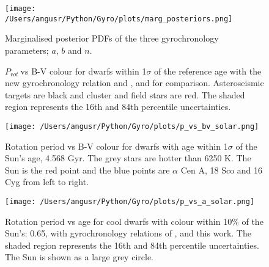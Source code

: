 \documentclass[10pt,preprint]{aastex}
\newcommand{\prot}{$P_{rot}~$}
\begin{document}
\begin{figure}[ht]
\begin{center}
\texttt{[image: /Users/angusr/Python/Gyro/plots/marg\_posteriors.png]}
\caption{Marginalised posterior PDFs of the three gyrochronology parameters; $a$, $b$ and $n$.}
\label{fig:marg_posteriors}
\end{center}
\end{figure}

\begin{figure}[ht]
\begin{center}
    \end{center}
    \caption{ \prot vs B-V colour for dwarfs within 1$\sigma$ of the reference age with the new gyrochronology relation and \citet{Barnes2007}, and \citet{Mamajek2008} for comparison. Asteroseismic targets are black and cluster and field stars are red. The shaded region represents the 16th and 84th percentile uncertainties.
     }
   \label{fig:subfigures2}
\end{figure}

\begin{figure}[ht]
\begin{center}
\texttt{[image: /Users/angusr/Python/Gyro/plots/p\_vs\_bv\_solar.png]}
\caption{Rotation period vs B-V colour for dwarfs with age within 1$\sigma$ of the Sun's age, 4.568 Gyr. The grey stars are hotter than 6250 K. The Sun is the red point and the blue points are $\alpha$ Cen A, 18 Sco and 16 Cyg from left to right.}
\label{fig:p_vs_bv_solar}
\end{center}
\end{figure}

\begin{figure}[ht]
\begin{center}
\texttt{[image: /Users/angusr/Python/Gyro/plots/p\_vs\_a\_solar.png]}
\caption{Rotation period vs age for cool dwarfs with colour within 10\% of the Sun's: 0.65, with gyrochronology relations of \citet{Barnes2007}, \citet{Mamajek2008} and this work. The shaded region represents the 16th and 84th percentile uncertainties. The Sun is shown as a large grey circle.}
\label{fig:p_vs_a_solar}
\end{center}
\end{figure}
\end{document}
